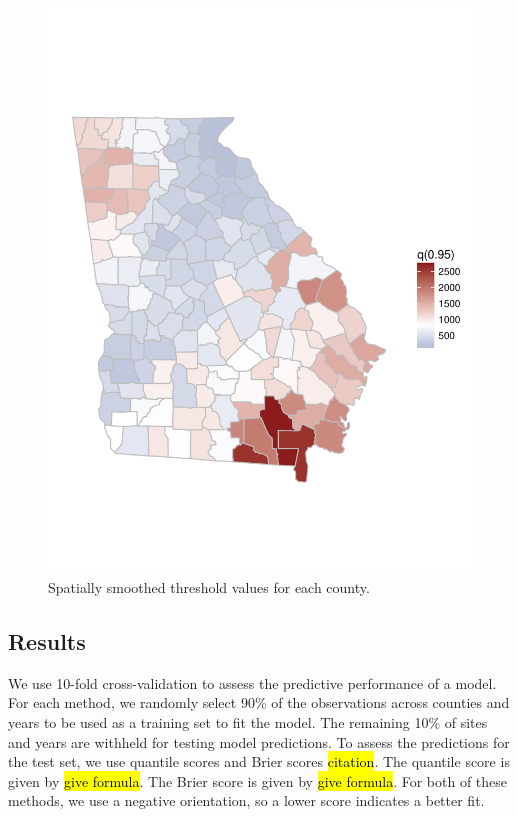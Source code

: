 \documentclass[11pt]{article}
\begin{document}
\begin{figure}[htbp]
  \centering
  \includegraphics[width = 0.47\linewidth, trim = 0 10em 0 10em]{plots/spatial-q95.pdf}
  \caption{Spatially smoothed threshold values for each county.}
  \label{fig:mrlthresh}
\end{figure}

\subsection{Results}\label{s:results}
We use 10-fold cross-validation to assess the predictive performance of a model.
For each method, we randomly select 90\% of the observations across counties and years to be used as a training set to fit the model.
The remaining 10\% of sites and years are withheld for testing model predictions.
To assess the predictions for the test set, we use quantile scores and Brier scores \hl{citation}.
The quantile score is given by \hl{give formula}.
The Brier score is given by \hl{give formula}.
For both of these methods, we use a negative orientation, so a lower score indicates a better fit.
\end{document}
